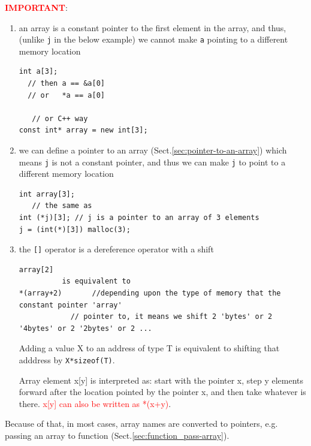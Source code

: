 % 
\textcolor{red}{\bf IMPORTANT}:
\begin{enumerate}
  
    \item an array is a constant pointer to the first element in the array, and
    thus, (unlike \verb!j! in the below example) we cannot make \verb!a!
    pointing to a different memory location
\begin{verbatim}
int a[3]; 
  // then a == &a[0]
  // or   *a == a[0]

   // or C++ way   
const int* array = new int[3]; 
\end{verbatim}    

    \item we can define a pointer to an array
    (Sect.\ref{sec:pointer-to-an-array}) which means \verb!j! is not a constant
    pointer, and thus we can make \verb!j! to point to a different memory location

\begin{verbatim}
int array[3];
   // the same as
int (*j)[3]; // j is a pointer to an array of 3 elements
j = (int(*)[3]) malloc(3);

\end{verbatim}
 
    \item the \verb![]! operator is a dereference operator with a shift
\begin{verbatim}
array[2]  
          is equivalent to 
*(array+2)       //depending upon the type of memory that the constant pointer 'array'
            // pointer to, it means we shift 2 'bytes' or 2 '4bytes' or 2 '2bytes' or 2 ...
\end{verbatim}
Adding a value X to an address of type T is equivalent to shifting that adddress
by \verb!X*sizeof(T)!.

Array element x[y] is interpreted as: start with the pointer x,
step y elements forward after the location pointed by the pointer x, and then
take whatever is there. 
\textcolor{red}{x[y] can also be written as *(x+y)}.


\end{enumerate}

Because of that, in most cases, array names are converted to pointers, e.g.
passing an array to function (Sect.\ref{sec:function_pass-array}).

